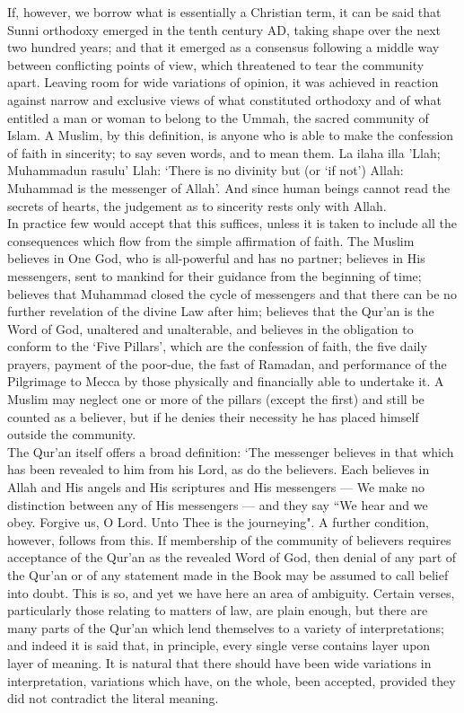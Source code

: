 \documentclass[10pt, twoside]{book}
\begin{document}
If, however, we borrow what is essentially a Christian term, it can be said that Sunni orthodoxy emerged in the tenth century AD, taking shape over the next two hundred years; and that it emerged as a consensus following a middle way between conflicting points of view, which threatened to tear the community apart. Leaving room for wide variations of opinion, it was achieved in reaction against narrow and exclusive views of what constituted orthodoxy and of what entitled a man or woman to belong to the Ummah, the sacred community of Islam. A Muslim, by this definition, is anyone who is able to make the confession of faith in sincerity; to say seven words, and to mean them. La ilaha illa 'Llah; Muhammadun rasulu' Llah: `There is no divinity but (or `if not') Allah: Muhammad is the messenger of Allah'. And since human beings cannot read the secrets of hearts, the judgement as to sincerity rests only with Allah. \\

In practice few would accept that this suffices, unless it is taken to include all the consequences which flow from the simple affirmation of faith. The Muslim believes in One God, who is all\hyp{}powerful and has no partner; believes in His messengers, sent to mankind for their guidance from the beginning of time; believes that Muhammad closed the cycle of messengers and that there can be no further revelation of the divine Law after him; believes that the Qur'an is the Word of God, unaltered and unalterable, and believes in the obligation to conform to the `Five Pillars', which are the confession of faith, the five daily prayers, payment of the poor\hyp{}due, the fast of Ramadan, and performance of the Pilgrimage to Mecca by those physically and financially able to undertake it. A Muslim may neglect one or more of the pillars (except the first) and still be counted as a believer, but if he denies their necessity he has placed himself outside the community. \\

The Qur'an itself offers a broad definition: `The messenger believes in that which has been revealed to him from his Lord, as do the believers. Each believes in Allah and His angels and His scriptures and His messengers --- We make no distinction between any of His messengers --- and they say ``We hear and we obey. Forgive us, O Lord. Unto Thee is the journeying". A further condition, however, follows from this. If membership of the community of believers requires acceptance of the Qur'an as the revealed Word of God, then denial of any part of the Qur'an or of any statement made in the Book may be assumed to call belief into doubt. This is so, and yet we have here an area of ambiguity. Certain verses, particularly those relating to matters of law, are plain enough, but there are many parts of the Qur'an which lend themselves to a variety of interpretations; and indeed it is said that, in principle, every single verse contains layer upon layer of meaning. It is natural that there should have been wide variations in interpretation, variations which have, on the whole, been accepted, provided they did not contradict the literal meaning. \\
\end{document}
